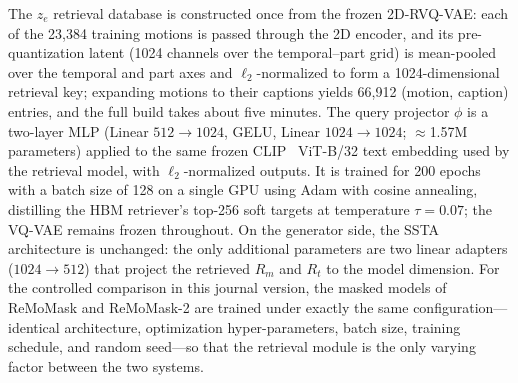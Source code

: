 \noindent {}
The $z_e$ retrieval database is constructed once from the frozen 2D-RVQ-VAE: each of the 23,384 training motions is passed through the 2D encoder, and its pre-quantization latent (1024 channels over the temporal--part grid) is mean-pooled over the temporal and part axes and $\ell_2$-normalized to form a 1024-dimensional retrieval key; expanding motions to their captions yields 66,912 (motion, caption) entries, and the full build takes about five minutes. The query projector $\phi$ is a two-layer MLP (Linear $512{\to}1024$, GELU, Linear $1024{\to}1024$; $\approx$1.57M parameters) applied to the same frozen CLIP~\cite{clip} ViT-B/32 text embedding used by the retrieval model, with $\ell_2$-normalized outputs. It is trained for 200 epochs with a batch size of 128 on a single GPU using Adam with cosine annealing, distilling the HBM retriever's top-256 soft targets at temperature $\tau = 0.07$; the VQ-VAE remains frozen throughout. On the generator side, the SSTA architecture is unchanged: the only additional parameters are two linear adapters ($1024 \to 512$) that project the retrieved $R_m$ and $R_t$ to the model dimension. For the controlled comparison in this journal version, the masked models of ReMoMask and ReMoMask-2 are trained under exactly the same configuration---identical architecture, optimization hyper-parameters, batch size, training schedule, and random seed---so that the retrieval module is the only varying factor between the two systems.